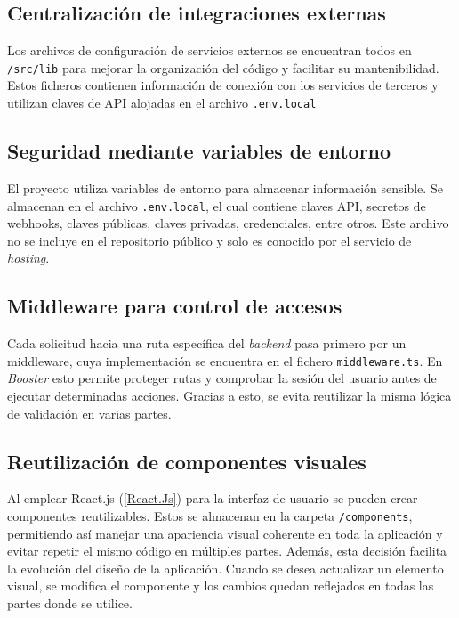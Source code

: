 \subsection{Centralización de integraciones externas}

Los archivos de configuración de servicios externos se encuentran todos en \texttt{/src/lib} para mejorar la organización del código y facilitar su mantenibilidad. Estos ficheros contienen información de conexión con los servicios de terceros y utilizan claves de API alojadas en el archivo \texttt{.env.local} 

\subsection{Seguridad mediante variables de entorno}

El proyecto utiliza variables de entorno para almacenar información sensible. Se almacenan en el archivo \texttt{.env.local}, el cual contiene claves API, secretos de webhooks, claves públicas, claves privadas, credenciales, entre otros. Este archivo no se incluye en el repositorio público y solo es conocido por el servicio de \textit{hosting}.

\subsection{Middleware para control de accesos}

Cada solicitud hacia una ruta específica del \textit{backend} pasa primero por un middleware, cuya implementación se encuentra en el fichero \texttt{middleware.ts}. En \textit{Booster} esto permite proteger rutas y comprobar la sesión del usuario antes de ejecutar determinadas acciones. Gracias a esto, se evita reutilizar la misma lógica de validación en varias partes.

\subsection{Reutilización de componentes visuales}

Al emplear React.js (\ref{React.Js}) para la interfaz de usuario se pueden crear componentes reutilizables. Estos se almacenan en la carpeta \texttt{/components}, permitiendo así manejar una apariencia visual coherente en toda la aplicación y evitar repetir el mismo código en múltiples partes. Además, esta decisión facilita la evolución del diseño de la aplicación. Cuando se desea actualizar un elemento visual, se modifica el componente y los cambios quedan reflejados en todas las partes donde se utilice.

